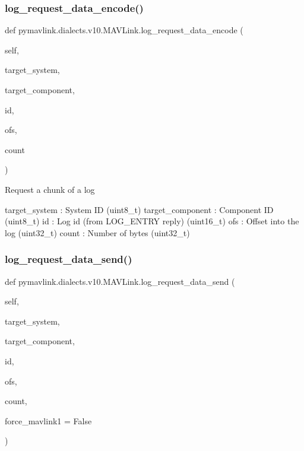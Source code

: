 \begin{DoxyVerb}
\begin{DoxyVerb}
\begin{DoxyVerb}
\begin{DoxyVerb}
\subsubsection{\texorpdfstring{log\+\_\+request\+\_\+data\+\_\+encode()}{log\_request\_data\_encode()}}
{\footnotesize\ttfamily def pymavlink.\+dialects.\+v10.\+M\+A\+V\+Link.\+log\+\_\+request\+\_\+data\+\_\+encode (\begin{DoxyParamCaption}\item[{}]{self,  }\item[{}]{target\+\_\+system,  }\item[{}]{target\+\_\+component,  }\item[{}]{id,  }\item[{}]{ofs,  }\item[{}]{count }\end{DoxyParamCaption})}

\begin{DoxyVerb}Request a chunk of a log

target_system             : System ID (uint8_t)
target_component          : Component ID (uint8_t)
id                        : Log id (from LOG_ENTRY reply) (uint16_t)
ofs                       : Offset into the log (uint32_t)
count                     : Number of bytes (uint32_t)\end{DoxyVerb}
 \mbox{\label{classpymavlink_1_1dialects_1_1v10_1_1MAVLink_a982ed32b2e29a8c473073b962d93b615}} 
\subsubsection{\texorpdfstring{log\+\_\+request\+\_\+data\+\_\+send()}{log\_request\_data\_send()}}
{\footnotesize\ttfamily def pymavlink.\+dialects.\+v10.\+M\+A\+V\+Link.\+log\+\_\+request\+\_\+data\+\_\+send (\begin{DoxyParamCaption}\item[{}]{self,  }\item[{}]{target\+\_\+system,  }\item[{}]{target\+\_\+component,  }\item[{}]{id,  }\item[{}]{ofs,  }\item[{}]{count,  }\item[{}]{force\+\_\+mavlink1 = {\ttfamily False} }\end{DoxyParamCaption})}


\end{DoxyVerb}
\end{DoxyVerb}
\end{DoxyVerb}
\end{DoxyVerb}
